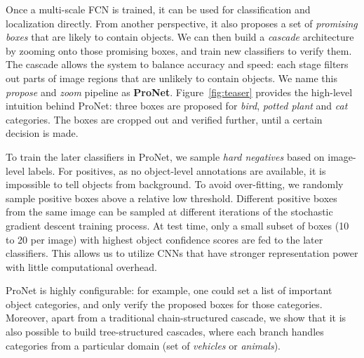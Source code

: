 \documentclass[10pt,twocolumn,letterpaper]{article}
\begin{document}

Once a multi-scale FCN is trained, it can be used for classification and localization directly. From another perspective, it also proposes a set of \textit{promising boxes} that are likely to contain objects. We can then build a \textit{cascade} architecture by zooming onto those promising boxes, and train new classifiers to verify them. The cascade allows the system to balance accuracy and speed: each stage filters out parts of image regions that are unlikely to contain objects. We name this \textit{propose} and \textit{zoom} pipeline as \textbf{ProNet}. Figure~\ref{fig:teaser} provides the high-level intuition behind ProNet: three boxes are proposed for \textit{bird}, \textit{potted plant} and \textit{cat} categories. The boxes are cropped out and verified further, until a certain decision is made.

To train the later classifiers in ProNet, we sample \textit{hard negatives} based on image-level labels. For positives, as no object-level annotations are available, it is impossible to tell objects from background. To avoid over-fitting, we randomly sample positive boxes above a relative low threshold. Different positive boxes from the same image can be sampled at different iterations of the stochastic gradient descent training process. At test time, only a small subset of boxes (10 to 20 per image) with highest object confidence scores are fed to the later classifiers. This allows us to utilize CNNs that have stronger representation power with little computational overhead.

ProNet is highly configurable: for example, one could set a list of important object categories, and only verify the proposed boxes for those categories. Moreover, apart from a traditional chain-structured cascade, we show that it is also possible to build tree-structured cascades, where each branch handles categories from a particular domain (\eg set of \textit{vehicles} or \textit{animals}). 
\end{document}
